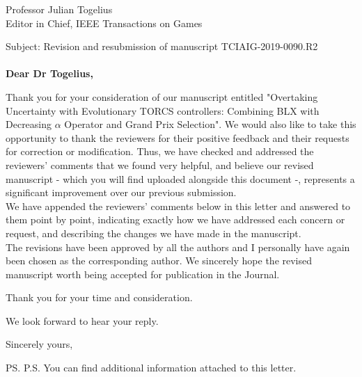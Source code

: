 \documentclass[10pt]{letter} %
\begin{document}

\begin{letter}{Professor Julian Togelius \\ Editor in Chief, IEEE Transactions on Games} %

\opening{Subject: Revision and resubmission of manuscript TCIAIG-2019-0090.R2\\
	\\	
\textbf{Dear Dr Togelius,}}

Thank you for your consideration of our manuscript entitled "Overtaking Uncertainty with Evolutionary TORCS controllers: Combining BLX with Decreasing $\alpha$ Operator and Grand Prix Selection". 
We would also like to take this opportunity to thank the reviewers for
their positive feedback and their requests for correction or modification. Thus, we have checked and addressed the reviewers' comments that we found very helpful, and believe our revised manuscript - which you will find uploaded alongside this document -, represents a significant improvement over our previous submission. \\


We have appended the reviewers' comments below in this letter and answered to them point by point, indicating exactly how we have addressed each concern or request, and describing the changes we have made in the manuscript.\\
The revisions have been approved by all the authors and I personally have again been chosen as the corresponding author.
We sincerely hope the revised manuscript worth being accepted for publication in the Journal.

Thank you for your time and consideration.

We look forward to hear your reply.

\vspace{2\parskip} %
\closing{Sincerely yours,}
\vspace{2\parskip} %

\ps{P.S. You can find additional information attached to this letter.} %


\end{letter}
\end{document}
